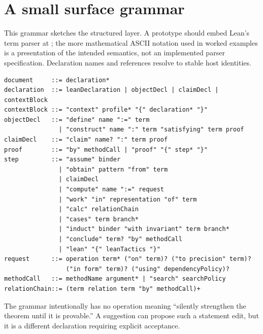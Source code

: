 \documentclass[11pt,a4paper]{article}
\newcommand{\code}[1]{\texttt{\detokenize{#1}}}
\theoremstyle{definition}
\theoremstyle{remark}
\begin{document}
\section{A small surface grammar}\label{app:grammar}
This grammar sketches the structured layer. A prototype should embed Lean's term parser at \code{term}; the more mathematical ASCII notation used in worked examples is a presentation of the intended semantics, not an implemented parser specification. Declaration names and references resolve to stable host identities.
\begin{lstlisting}
document     ::= declaration*
declaration  ::= leanDeclaration | objectDecl | claimDecl | contextBlock
contextBlock ::= "context" profile* "{" declaration* "}"
objectDecl   ::= "define" name ":=" term
               | "construct" name ":" term "satisfying" term proof
claimDecl    ::= "claim" name? ":" term proof
proof        ::= "by" methodCall | "proof" "{" step* "}"
step         ::= "assume" binder
               | "obtain" pattern "from" term
               | claimDecl
               | "compute" name ":=" request
               | "work" "in" representation "of" term
               | "calc" relationChain
               | "cases" term branch*
               | "induct" binder "with invariant" term branch*
               | "conclude" term? "by" methodCall
               | "lean" "{" leanTactics "}"
request      ::= operation term* ("on" term)? ("to precision" term)?
                 ("in form" term)? ("using" dependencyPolicy)?
methodCall   ::= methodName argument* | "search" searchPolicy
relationChain::= (term relation term "by" methodCall)+
\end{lstlisting}
The grammar intentionally has no operation meaning ``silently strengthen the theorem until it is provable.'' A suggestion can propose such a statement edit, but it is a different declaration requiring explicit acceptance.
\end{document}

